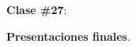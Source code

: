 \documentclass[letterpaper]{article}
\renewenvironment{itemize}{
  \begin{list}{}{
    \setlength{\leftmargin}{1.5em}
  }
}{
  \end{list}
}
\begin{document}
\begin{enumerate}



      \begin{itemize} 
        \item[$\bullet$] {\bf Clase \#27}:
          \begin{itemize} 
            \item[$\circ$] {\bf Presentaciones finales}.
          \end{itemize}
       \end{itemize}






			


			

\end{enumerate}


\newpage
{}
\setcounter{page}{1}
\printbibliography
\end{document}
